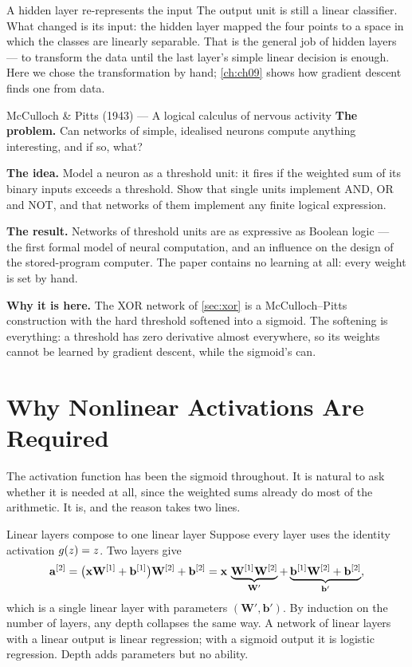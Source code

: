 \begin{keyinsight}{A hidden layer re-represents the input}
The output unit is still a linear classifier. What changed is its input: the
hidden layer mapped the four points to a space in which the classes are linearly
separable. That is the general job of hidden layers --- to transform the data
until the last layer's simple linear decision is enough. Here we chose the
transformation by hand; \cref{ch:ch09} shows how gradient descent finds one from
data.
\end{keyinsight}

\begin{researchspotlight}{McCulloch \& Pitts (1943) --- A logical calculus of nervous activity}
\textbf{The problem.} Can networks of simple, idealised neurons compute
anything interesting, and if so, what?

\textbf{The idea.} Model a neuron as a threshold unit: it fires if the weighted
sum of its binary inputs exceeds a threshold. Show that single units implement
AND, OR and NOT, and that networks of them implement any finite logical
expression.

\textbf{The result.} Networks of threshold units are as expressive as Boolean
logic --- the first formal model of neural computation, and an influence on the
design of the stored-program computer. The paper contains no learning at all:
every weight is set by hand.

\textbf{Why it is here.} The XOR network of \cref{sec:xor} is a McCulloch--Pitts
construction with the hard threshold softened into a sigmoid. The softening is
everything: a threshold has zero derivative almost everywhere, so its weights
cannot be learned by gradient descent, while the sigmoid's can.
\parencite{mcculloch1943}
\end{researchspotlight}

\section{Why Nonlinear Activations Are Required}
\label{sec:collapse}

The activation function has been the sigmoid throughout. It is natural to ask
whether it is needed at all, since the weighted sums already do most of the
arithmetic. It is, and the reason takes two lines.

\begin{derivation}{Linear layers compose to one linear layer}
Suppose every layer uses the identity activation $g(z) = z$. Two layers give
\[
  \mathbf{a}^{[2]} = \bigl(\mathbf{x}\mathbf{W}^{[1]} + \mathbf{b}^{[1]}\bigr)\mathbf{W}^{[2]} + \mathbf{b}^{[2]}
            = \mathbf{x}\,\underbrace{\mathbf{W}^{[1]}\mathbf{W}^{[2]}}_{\mathbf{W}'}
              + \underbrace{\mathbf{b}^{[1]}\mathbf{W}^{[2]} + \mathbf{b}^{[2]}}_{\mathbf{b}'} ,
\]
which is a single linear layer with parameters $(\mathbf{W}',\mathbf{b}')$. By
induction on the number of layers, any depth collapses the same way. A network
of linear layers with a linear output is linear regression; with a sigmoid
output it is logistic regression. Depth adds parameters but no ability.
\end{derivation}

